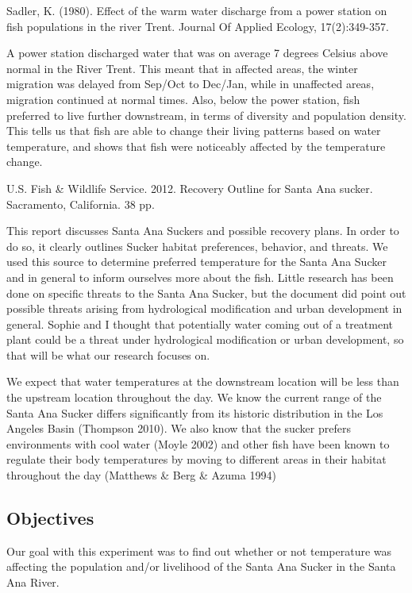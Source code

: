 \documentclass{article}\usepackage[]{graphicx}\usepackage[]{color}
\begin{document}
Sadler, K. (1980). Effect of the warm water discharge from a power station on fish populations in the river Trent. Journal Of Applied Ecology, 17(2):349-357.

A power station discharged water that was on average 7 degrees Celsius above normal in the River Trent. This meant that in affected areas, the winter migration was delayed from Sep/Oct to Dec/Jan, while in unaffected areas, migration continued at normal times. Also, below the power station, fish preferred to live further downstream, in terms of diversity and population density. This tells us that fish are able to change their living patterns based on water temperature, and shows that fish were noticeably affected by the temperature change. 

U.S. Fish \& Wildlife Service. 2012. Recovery Outline for Santa Ana sucker. Sacramento, California. 38 pp.

This report discusses Santa Ana Suckers and possible recovery plans. In order to do so, it clearly outlines Sucker habitat preferences, behavior, and threats. We used this source to determine preferred temperature for the Santa Ana Sucker and in general to inform ourselves more about the fish. Little research has been done on specific threats to the Santa Ana Sucker, but the document did point out possible threats arising from hydrological modification and urban development in general. Sophie and I thought that potentially water coming out of a treatment plant could be a threat under hydrological modification or urban development, so that will be what our research focuses on.

We expect that water temperatures at the downstream location will be less than the upstream location throughout the day. We know the current range of the Santa Ana Sucker differs significantly from its historic distribution in the Los Angeles Basin (Thompson 2010). We also know that the sucker prefers environments with cool water (Moyle 2002) and other fish have been known to regulate their body temperatures by moving to different areas in their habitat throughout the day (Matthews & Berg & Azuma 1994)

\subsection{Objectives}
Our goal with this experiment was to find out whether or not temperature was affecting the population and/or livelihood of the Santa Ana Sucker in the Santa Ana River.
\end{document}
